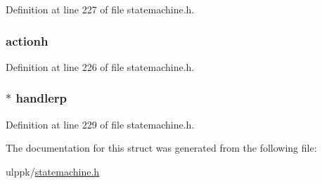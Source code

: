 Definition at line 227 of file statemachine.\-h.

\hypertarget{struct__action__struct_a87a885769fc28e2a0b66f0d169e05d90}{
\subsubsection[{actionh}]{ actionh}}\label{struct__action__struct_a87a885769fc28e2a0b66f0d169e05d90}


Definition at line 226 of file statemachine.\-h.

\hypertarget{struct__action__struct_ac35034228daf46ee499eff841375110c}{
\subsubsection[{handlerp}]{$\ast$ handlerp}}\label{struct__action__struct_ac35034228daf46ee499eff841375110c}


Definition at line 229 of file statemachine.\-h.



The documentation for this struct was generated from the following file\-:\begin{DoxyCompactItemize}
\item 
ulppk/\hyperlink{statemachine_8h}{statemachine.\-h}\end{DoxyCompactItemize}
